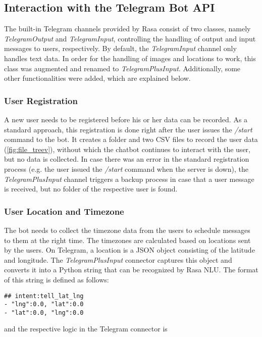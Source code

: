 \subsection{Interaction with the Telegram Bot API}
The built-in Telegram channels provided by Rasa consist of two classes, namely \emph{TelegramOutput} and \emph{TelegramInput}, controlling the handling of output and input messages to users, respectively. By default, the \emph{TelegramInput} channel only handles text data. In order for the handling of images and locations to work, this class was augmented and renamed to \emph{TelegramPlusInput}. Additionally, some other functionalities were added, which are explained below.

\subsubsection{User Registration}
A new user needs to be registered before his or her data can be recorded. As a standard approach, this registration is done right after the user issues the \emph{/start} command to the bot. It creates a folder and two CSV files to record the user data (\autoref{fig:file_treev}), without which the chatbot continues to interact with the user, but no data is collected. In case there was an error in the standard registration process (e.g. the user issued the \emph{/start} command when the server is down), the \emph{TelegramPlusInput} channel triggers a backup process in case that a user message is received, but no folder of the respective user is found.

\subsubsection{User Location and Timezone}
The bot needs to collect the timezone data from the users to schedule messages to them at the right time. The timezones are calculated based on locations sent by the users. On Telegram, a location is a JSON object consisting of the latitude and longitude. The \emph{TelegramPlusInput} connector captures this object and converts it into a Python string that can be recognized by Rasa NLU. The format of this string is defined as follows:

\begin{lstlisting}
## intent:tell_lat_lng
- "lng":0.0, "lat":0.0
- "lat":0.0, "lng":0.0
\end{lstlisting}

\bigskip
and the respective logic in the Telegram connector is

